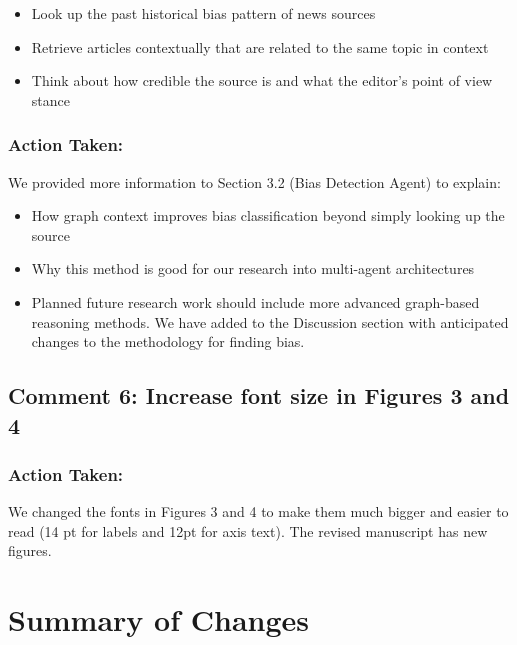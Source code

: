 \documentclass[11pt]{article}
\begin{document}
\begin{itemize}
    \item Look up the past historical bias pattern of news sources
    \item Retrieve  articles contextually that are related  to the same topic in context
    \item Think about how credible the source is and what the editor's point of view stance

\end{itemize}

\subsubsection*{Action Taken:}
We provided more information to Section 3.2 (Bias Detection Agent) to explain:

\begin{itemize}
    \item How graph context improves bias classification beyond simply looking up the source

    \item Why this method is good for our research into multi-agent architectures
    \item Planned future research work should include more advanced graph-based reasoning methods. We have added to the Discussion section with anticipated changes to the methodology for finding bias.


\end{itemize}

\subsection{Comment 6: Increase font size in Figures 3 and 4}

\subsubsection*{Action Taken:}

 We changed the fonts in Figures 3 and 4 to make them much bigger and easier to read (14 pt for labels and 12pt for axis text). The revised manuscript has new figures.


\section{Summary of Changes}
\end{document}
